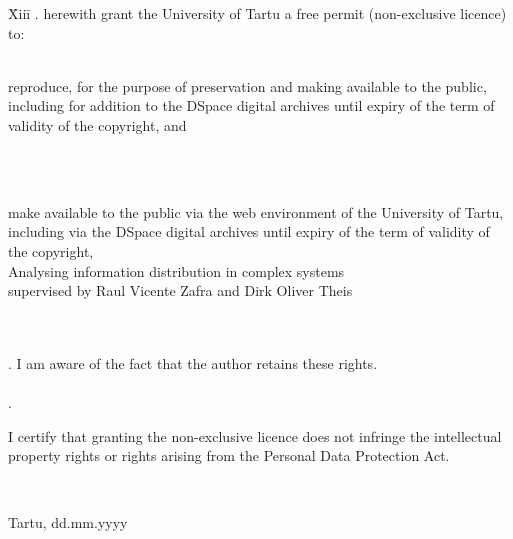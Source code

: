 \documentclass[12pt]{article}
\begin{document}
\begin{tabbing}
\= Xiii\=\kill
{}. \> herewith grant the University of Tartu a free permit (non-exclusive licence) to:\\\\ 

\> 
\begin{minipage}[t]{14.2cm}
reproduce, for the purpose of preservation and making available to the public, including for addition to the DSpace digital archives until expiry of the term of validity of the copyright, and
\end{minipage}
\\\\
\begin{minipage}[t]{14.2cm}
make available to the public via the web environment of the University of Tartu, including via the DSpace digital archives until expiry of the term of validity of the copyright,\\ 

Analysing information distribution in complex systems\\   

supervised by Raul Vicente Zafra and Dirk Oliver Theis

\end{minipage}\\\\ 
. \>I am aware of the fact that the author retains these rights.\\\\
. \>
\begin{minipage}[t]{14.2cm}
I certify that granting the non-exclusive licence does not infringe the intellectual property rights or rights arising from the Personal Data Protection Act. 
\end{minipage}\\
\end{tabbing}

\noindent
Tartu, dd.mm.yyyy
\end{document}

